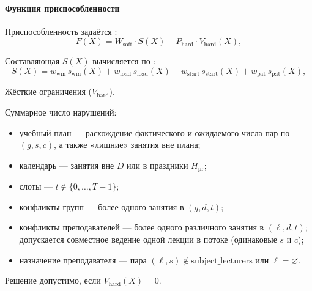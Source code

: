 \paragraph{Функция приспособленности}

Приспособленность задаётся :
\begin{equation}
	F(X)=W_{\mathrm{soft}}\cdot S(X)-P_{\mathrm{hard}}\cdot V_{\mathrm{hard}}(X),
	\label{eq:fitness}
\end{equation}

Составляющая $S(X)$ вычисляется по :
\begin{equation}
	S(X)=
	w_{\mathrm{win}}\,s_{\mathrm{win}}(X)+
	w_{\mathrm{load}}\,s_{\mathrm{load}}(X)+
	w_{\mathrm{start}}\,s_{\mathrm{start}}(X)+
	w_{\mathrm{pat}}\,s_{\mathrm{pat}}(X),
	\label{eq:fitness-soft}
\end{equation}

Жёсткие ограничения ($V_{\mathrm{hard}}$).

Суммарное число нарушений:
\begin{itemize}
	\item учебный план --- расхождение фактического и ожидаемого
	числа пар по $(g,s,c)$, а также «лишние» занятия вне плана;
	\item календарь --- занятия вне $D$ или в праздники $H_{\mathrm{pr}}$;
	\item слоты --- $t\notin\{0,\ldots,T-1\}$;
	\item конфликты групп --- более одного занятия в
	$(g,d,t)$;
	\item конфликты преподавателей --- более одного различного
	занятия в $(\ell,d,t)$; допускается совместное ведение одной лекции
	в потоке (одинаковые $s$ и $c$);
	\item назначение преподавателя --- пара $(\ell,s)\notin\mathrm{subject\_lecturers}$
	или $\ell=\varnothing$.
\end{itemize}
Решение допустимо, если $V_{\mathrm{hard}}(X)=0$.

